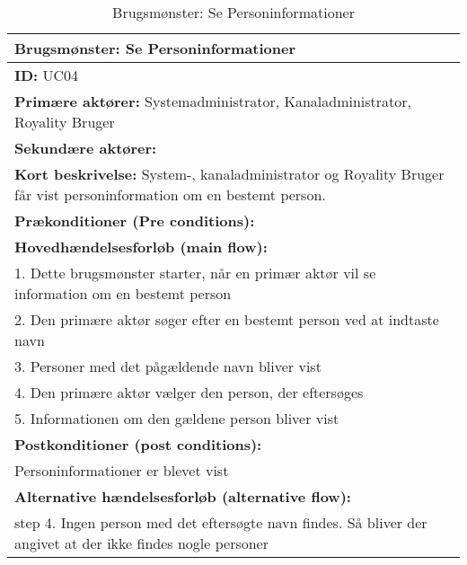 \begin{table}[ht]
    \begin{tabularx}{\textwidth}{|X|}
            \hline
            \textbf{Brugsmønster:}  Se Personinformationer \\ 
            \hline
        	\textbf{ID:} UC04 \\ 
        	\hline
        	\textbf{Primære aktører:} Systemadministrator, Kanaladministrator, Royality Bruger \\ \hline
        	\textbf{Sekundære aktører:} \\ \hline
        	\textbf{Kort beskrivelse:} System-, kanaladministrator og Royality Bruger får vist personinformation om en bestemt person. \\ \hline
        	\textbf{Prækonditioner (Pre conditions):} \\ \hline
        \textbf{Hovedhændelsesforløb (main flow):} \\
        1. Dette brugsmønster starter, når en primær aktør vil se information om en bestemt person \\ 
        2. Den primære aktør søger efter en bestemt person ved at indtaste navn \\ 
        3. Personer med det pågældende navn bliver vist \\ 
        4. Den primære aktør vælger den person, der eftersøges \\
        5. Informationen om den gældene person bliver vist \\ \hline
            \textbf{Postkonditioner (post conditions):} \\
            Personinformationer er blevet vist \\ \hline
        
        	\textbf{Alternative hændelsesforløb (alternative flow):} \\
        step 4. Ingen person med det eftersøgte navn findes. Så bliver der angivet at der ikke findes nogle personer\\ \hline
    \end{tabularx}
    \caption{Brugsmønster: Se Personinformationer}
    \label{table:read_personinfo}
\end{table}



